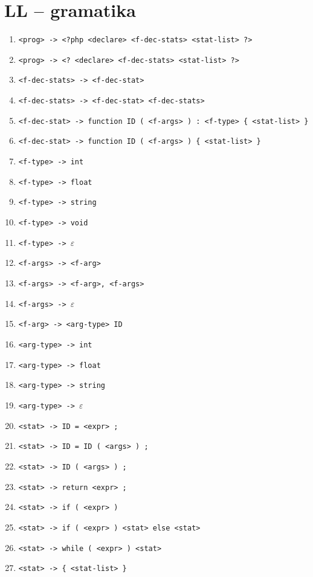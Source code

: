 \documentclass[a4paper, 11pt]{article}
\begin{document}
	\section{LL -- gramatika}
	    \begin{table}[!ht]
		\centering
		\begin{enumerate}[noitemsep]
			\item \verb|<prog> -> <?php <declare> <f-dec-stats> <stat-list> ?>|
			\item \verb|<prog> -> <? <declare> <f-dec-stats> <stat-list> ?>|

			\item \verb|<f-dec-stats> -> <f-dec-stat>|
			\item \verb|<f-dec-stats> -> <f-dec-stat> <f-dec-stats>|

			\item \verb|<f-dec-stat> -> function ID ( <f-args> ) : <f-type> { <stat-list> }|
			\item \verb|<f-dec-stat> -> function ID ( <f-args> ) { <stat-list> }|

			\item \verb|<f-type> -> int|
			\item \verb|<f-type> -> float|
			\item \verb|<f-type> -> string|
			\item \verb|<f-type> -> void|
            \item \verb|<f-type> -> |$\varepsilon$

			\item \verb|<f-args> -> <f-arg>|
			\item \verb|<f-args> -> <f-arg>, <f-args>|
			\item \verb|<f-args> -> |$\varepsilon$

			\item \verb|<f-arg> -> <arg-type> ID|

            \item \verb|<arg-type> -> int|
            \item \verb|<arg-type> -> float|
            \item \verb|<arg-type> -> string|
            \item \verb|<arg-type> -> |$\varepsilon$

			\item \verb|<stat> -> ID = <expr> ;|
			\item \verb|<stat> -> ID = ID ( <args> ) ;|
			\item \verb|<stat> -> ID ( <args> ) ;|
			\item \verb|<stat> -> return <expr> ;|
			\item \verb|<stat> -> if ( <expr> )|
			\item \verb|<stat> -> if ( <expr> ) <stat> else <stat>|
			\item \verb|<stat> -> while ( <expr> ) <stat>|
			\item \verb|<stat> -> { <stat-list> }|


\end{enumerate}
\end{table}
\end{document}
